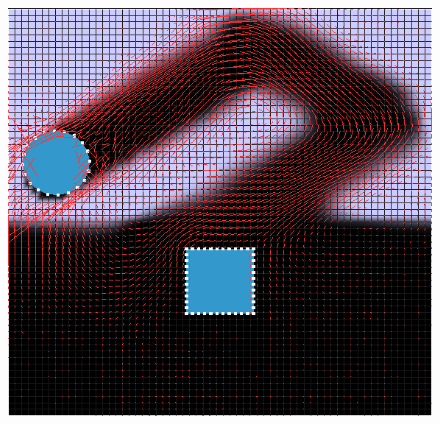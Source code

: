 \begin{figure}[!htb]
\centering
  \includegraphics[height=0.5\textwidth]{img/objectfluid}
  \label{fig:objectfluid}
\end{figure} 